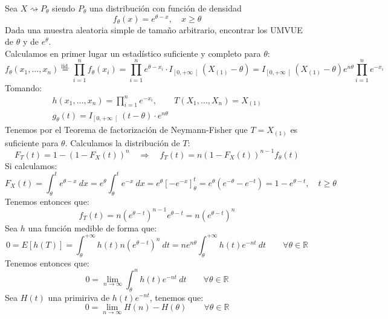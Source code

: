 \begin{ejercicio}
    Sea $X\rightsquigarrow P_\theta$ siendo $P_\theta$ una distribución con función de densidad
    \begin{equation*}
        f_\theta(x) = e^{\theta-x}, \quad x\geq \theta
    \end{equation*}
    Dada una muestra aleatoria simple de tamaño arbitrario, encontrar los UMVUE de $\theta$ y de $e^{\theta}$.\\

    \noindent
    Calculamos en primer lugar un estadístico suficiente y completo para $\theta$:
    \begin{equation*}
        f_\theta(x_1, \ldots, x_n) \stackrel{\text{iid.}}{=} \prod_{i=1}^{n}f_\theta(x_i) = \prod_{i=1}^{n} e^{\theta-x_i} \cdot I_{\left[0,+\infty\right[}(X_{(1)}-\theta)=I_{\left[0,+\infty\right[}(X_{(1)}-\theta) e^{n\theta}\prod_{i=1}^{n} e^{-x_i}
    \end{equation*}
    Tomando:
    \begin{gather*}
        h(x_1, \ldots, x_n) = \prod_{i=1}^{n}e^{-x_i}, \qquad T(X_1, \ldots, X_n) = X_{(1)} \\
        g_\theta(t) = I_{\left[0,+\infty\right[}(t-\theta) \cdot e^{n\theta}
    \end{gather*}
    Tenemos por el Teorema de factorización de Neymann-Fisher que $T=X_{(1)}$ es suficiente para $\theta$. Calculamos la distribución de $T$:
    \begin{equation*}
        F_T(t) = 1-{(1-F_X(t))}^{n} \quad \Longrightarrow \quad f_T(t) = n{(1-F_X(t))}^{n-1}f_\theta(t)
    \end{equation*}
    Si calculamos:
    \begin{equation*}
        F_X(t) = \int_{\theta}^{t} e^{\theta-x}~dx  = e^{\theta}\int_{\theta}^{t} e^{-x}~dx  = e^{\theta}[-e^{-x}]_\theta^t = e^{\theta}\left(e^{-\theta} - e^{-t}\right) = 1- e^{\theta-t}, \quad t\geq \theta
    \end{equation*}
    Tenemos entonces que:
    \begin{equation*}
        f_T(t) = n{\left(e^{\theta-t}\right)}^{n-1} e^{\theta-t} = n{\left(e^{\theta-t}\right)}^{n}
    \end{equation*}
    Sea $h$ una función medible de forma que:
    \begin{equation*}
        0 = E[h(T)] = \int_{\theta}^{+\infty} h(t)n{\left(e^{\theta-t}\right)}^{n}~dt  = ne^{n\theta} \int_{\theta}^{+\infty}h(t)e^{-nt} ~dt \qquad \forall \theta\in \mathbb{R}
    \end{equation*}
    Tenemos entonces que:
    \begin{equation*}
        0 = \lim_{n\to\infty}\int_{\theta}^{n} h(t)e^{-nt}~dt  \qquad \forall \theta\in \mathbb{R}
    \end{equation*}
    Sea $H(t)$ una primiriva de $h(t)e^{-nt}$, tenemos que:
    \begin{equation*}
        0 = \lim_{n\to\infty}H(n)-H(\theta)\qquad \forall \theta\in \mathbb{R}
    \end{equation*}


\end{ejercicio}
